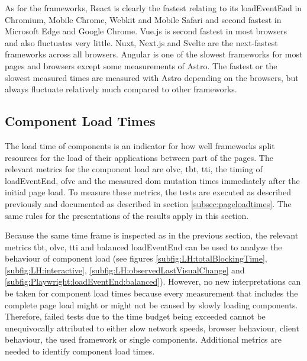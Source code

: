 \documentclass[a4paper, 12pt]{article}
\begin{document}
As for the frameworks, React is clearly the fastest relating to its loadEventEnd in Chromium, Mobile Chrome, Webkit and Mobile Safari and second fastest in Microsoft Edge and Google Chrome.
Vue.js is second fastest in most browsers and also fluctuates very little. Nuxt, Next.js and Svelte are the next-fastest frameworks across all browsers.
Angular is one of the slowest frameworks for most pages and browsers except some measurements of Astro.
The fastest or the slowest measured times are measured with Astro depending on the browsers, but always fluctuate relatively much compared to other frameworks.


\subsection{Component Load Times}\label{subsec:componentloadtimes}

The load time of components is an indicator for how well frameworks split resources for the load of their applications between part of the pages.
The relevant metrics for the component load are \acrfull{olvc}, \acrfull{tbt}, \acrfull{tti}, the timing of loadEventEnd, \acrfull{ofvc} and the measured \acrshort{dom} mutation times immediately after the initial page load.
To measure these metrics, the tests are executed as described previously and documented as described in section \ref{subsec:pageloadtimes}.
The same rules for the presentations of the results apply in this section.

Because the same time frame is inspected as in the previous section, the relevant metrics \acrshort{tbt}, \acrshort{olvc}, \acrshort{tti} and balanced loadEventEnd can be used to analyze the behaviour of component load (see figures \ref{subfig:LH:totalBlockingTime}, \ref{subfig:LH:interactive}, \ref{subfig:LH:observedLastVisualChange} and \ref{subfig:Playwright:loadEventEnd:balanced}).
However, no new interpretations can be taken for component load times because every measurement that includes the complete page load might or might not be caused by slowly loading components.
Therefore, failed tests due to the time budget being exceeded cannot be unequivocally attributed to either slow network speeds, browser behaviour, client behaviour, the used framework or single components.
Additional metrics are needed to identify component load times.
\end{document}
